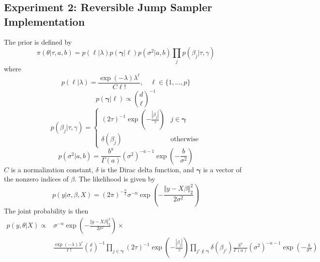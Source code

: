 \subsection{Experiment 2: Reversible Jump Sampler Implementation}
\label{appendix:ex2}
The prior is defined by
\begin{equation}
  \pi(\theta|\tau, a, b ) = p(\ell|\lambda) p(\mathbf{\gamma}|\ell) p(\sigma^{2} | a, b) \prod_{j} p(\beta_{j} | \tau, \gamma) 
\end{equation}
where
\begin{equation}
  p(\ell|\lambda) = \frac{\exp{(-\lambda)} \lambda^{\ell}}{C\ell!}, \quad \ell \in \{1,\ldots, p\}
\end{equation}
\begin{equation}
  p(\mathbf{\gamma}|\ell) \propto {d\choose \ell}^{-1}
\end{equation}
\begin{equation}
  p(\beta_{j} | \tau, \gamma ) = \begin{cases} (2\tau)^{-1}\exp(-\frac{|\beta_{j}|}{\tau}) & j \in \mathbf{\gamma} \\ \delta(\beta_{j}) & \text{otherwise} \end{cases}
\end{equation}
\begin{equation}
    p(\sigma^{2} | a, b) = \frac{b^{a}}{\Gamma(a)} (\sigma^{2})^{-a-1} \exp{\left(-\frac{b}{\sigma^{2}}\right)}
\end{equation}
$C$ is a normalization constant, $\delta$ is the Dirac delta function, and $\mathbf{\gamma}$ is a vector of the nonzero indices of $\beta$.
The likelihood is given by
\begin{equation}
  p(y | \sigma, \beta, X ) = (2\pi)^{-\frac{n}{2}} \sigma^{-n} \exp{\left(-\frac{\Vert y-X\beta\Vert^{2}_{2}}{2\sigma^{2}}\right)}
\end{equation}
The joint probability is then
\begin{equation}
    \begin{aligned}
         p(y, \theta | X ) \propto &\sigma^{-n} \exp{\left(-\frac{\Vert  y-X\beta\Vert^{2}_{2}}{2\sigma^{2}}\right)} \times \\ 
         & \frac{\exp{(-\lambda)} \lambda^{\ell}}{\ell!} {d\choose \ell}^{-1} \prod_{j\in \mathbf{\gamma}} (2\tau)^{-1}\exp\left(-\frac{|\beta_{j}|}{\tau}\right) \prod_{j' \notin \mathbf{\gamma}} \delta(\beta_{j'}) \frac{b^{a}}{\Gamma(a)} (\sigma^{2})^{-a-1} \exp{\left(-\frac{b}{\sigma^{2}}\right)}
    \end{aligned}
    \label{eq:ex2_joint}
\end{equation}

